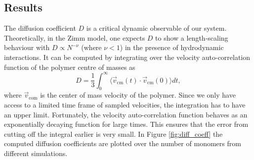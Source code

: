 \subsection{Results}
The diffusion coefficient $D$ is a critical dynamic observable of our system. Theoretically, in the Zimm model, one expects $D$ to show a length-scaling behaviour with $D \propto N^{-\nu}$ (where $\nu < 1$) in the presence of hydrodynamic interactions. It can be computed by integrating over the velocity auto-correlation  function of the polymer centre of masses as
\begin{equation}
	D = \frac{1}{3} \int_{0}^{\infty} \langle \vec{v}_\text{cm}(t) \cdot \vec{v}_\text{cm}(0) \rangle dt,
\end{equation}
where $\vec{v}_\text{com}$ is the center of mass velocity of the polymer. Since we only have access to a limited time frame of sampled velocities, the integration has to have an upper limit. Fortunately, the velocity auto-correlation function behaves as an exponentially decaying function for large times. This ensures that the error from cutting off the integral earlier is very small. In Figure \ref{fig:diff_coeff} the computed diffusion coefficients are plotted over the number of monomers from different simulations.

